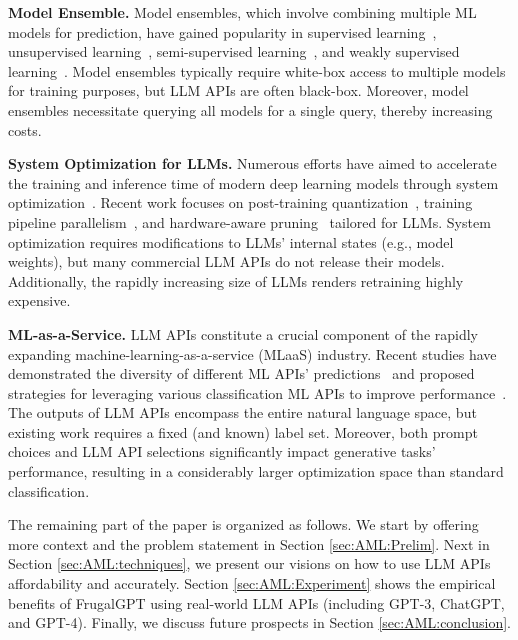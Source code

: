 \documentclass{article}
\numberwithin{equation}{section}
\newcommand{\systemFGPT}{{FrugalGPT}}
\begin{document}
\textbf{Model Ensemble.} Model ensembles, which involve combining multiple ML models for prediction, have gained popularity in supervised learning~\cite{viola2004robust, friedman2002stochastic}, unsupervised learning~\cite{yang2014exploring}, semi-supervised learning~\cite{gupta2022semi}, and weakly supervised learning~\cite{diba2017weakly}. Model ensembles typically require white-box access to multiple models for training purposes, but LLM APIs are often black-box. Moreover, model ensembles necessitate querying all models for a single query, thereby increasing costs.

\textbf{System Optimization for LLMs.} Numerous efforts have aimed to accelerate the training and inference time of modern deep learning models through system optimization~\cite{han2015deep,cai2017deep,cass2019taking,jia2019beyond,recht2011hogwild}. Recent work focuses on post-training quantization~\cite{bai2022towards, yao2023comprehensive,xiao2022smoothquant}, training pipeline parallelism~\cite{li2021terapipe}, and hardware-aware pruning~\cite{kurtic2023ziplm} tailored for LLMs. System optimization requires modifications to LLMs' internal states (e.g., model weights), but many commercial LLM APIs do not release their models. Additionally, the rapidly increasing size of LLMs renders retraining highly expensive.

\textbf{ML-as-a-Service.} LLM APIs constitute a crucial component of the rapidly expanding machine-learning-as-a-service (MLaaS) industry. Recent studies have demonstrated the diversity of different ML APIs' predictions~\cite{buolamwini2018gender,koenecke2020racial,chen2021did} and proposed strategies for leveraging various classification ML APIs to improve performance~\cite{chen2020frugalml,chen2022efficient}. The outputs of LLM APIs encompass the entire natural language space, but existing work requires a fixed (and known) label set. Moreover, both prompt choices and LLM API selections significantly impact generative tasks' performance, resulting in a considerably larger optimization space than standard classification.

The remaining part of the paper is organized as follows.
We start by offering more context and the problem statement in Section \ref{sec:AML:Prelim}.
Next in Section \ref{sec:AML:techniques}, we present our visions on how to use LLM  APIs affordability and accurately.
Section \ref{sec:AML:Experiment} shows the empirical benefits of \systemFGPT{}  using real-world LLM APIs (including GPT-3, ChatGPT, and GPT-4). Finally, we discuss future prospects in Section \ref{sec:AML:conclusion}.
\end{document}
